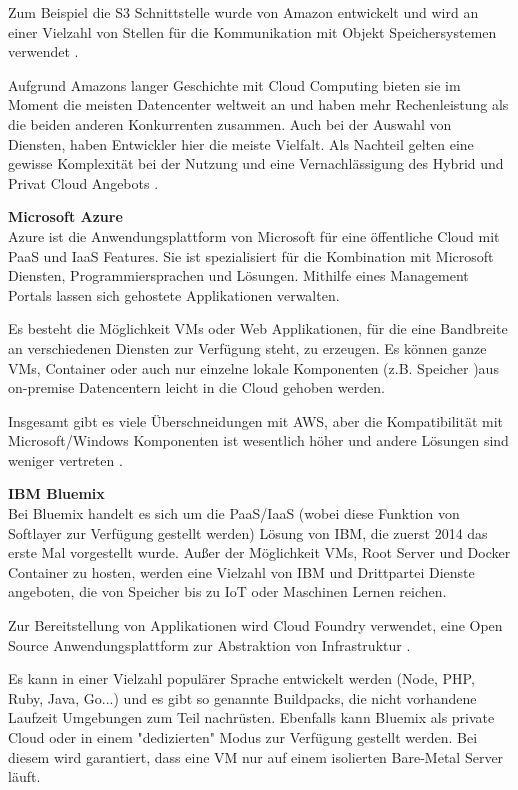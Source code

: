 Zum Beispiel die \ac{S3} Schnittstelle wurde von Amazon entwickelt und wird an einer Vielzahl von Stellen für die Kommunikation mit Objekt Speichersystemen verwendet \parencite{aws.2017}.

Aufgrund Amazons langer Geschichte mit Cloud Computing bieten sie im Moment die meisten Datencenter weltweit an und haben mehr Rechenleistung als die beiden anderen Konkurrenten zusammen. Auch bei der Auswahl von Diensten, haben Entwickler hier die meiste Vielfalt. Als Nachteil gelten eine gewisse Komplexität bei der Nutzung und eine Vernachlässigung des Hybrid und Privat Cloud Angebots \parencite{computerworlduk.2016}.


\textbf{Microsoft Azure}\\
Azure ist die Anwendungsplattform von Microsoft für eine öffentliche Cloud mit \acs{PaaS} und \acs{IaaS} Features. Sie ist spezialisiert für die Kombination mit Microsoft Diensten, Programmiersprachen und Lösungen. Mithilfe eines Management Portals lassen sich gehostete Applikationen verwalten. 

Es besteht die Möglichkeit \ac{VM}s oder Web Applikationen, für die eine Bandbreite an verschiedenen Diensten zur Verfügung steht, zu erzeugen. Es können ganze \acs{VM}s, Container oder auch nur einzelne lokale Komponenten (z.B. Speicher )aus on-premise Datencentern leicht in die Cloud gehoben werden.

Insgesamt gibt es viele Überschneidungen mit \acs{AWS}, aber die Kompatibilität mit Microsoft/Windows Komponenten ist wesentlich höher und andere Lösungen sind weniger vertreten \parencite{microsoft.2015}.


\textbf{IBM Bluemix}\\
Bei Bluemix handelt es sich um die \acs{PaaS}/\acs{IaaS} (wobei diese Funktion von Softlayer zur Verfügung gestellt werden) Lösung von IBM, die zuerst 2014 das erste Mal vorgestellt wurde. Außer der Möglichkeit \acs{VM}s, Root Server und Docker Container zu hosten, werden eine Vielzahl von IBM und Drittpartei Dienste angeboten, die von Speicher bis zu \acs{IoT} oder Maschinen Lernen reichen.	

Zur Bereitstellung von Applikationen wird Cloud Foundry verwendet, eine Open Source Anwendungsplattform zur Abstraktion von Infrastruktur \parencite{bluemix.2017}.

Es kann in einer Vielzahl populärer Sprache entwickelt werden (Node, PHP, Ruby, Java, Go...) und es gibt so genannte Buildpacks, die nicht vorhandene Laufzeit Umgebungen zum Teil nachrüsten. Ebenfalls kann Bluemix als private Cloud oder in einem "dedizierten" Modus zur Verfügung gestellt werden. Bei diesem wird garantiert, dass eine \acs{VM} nur auf einem isolierten Bare-Metal Server läuft.

